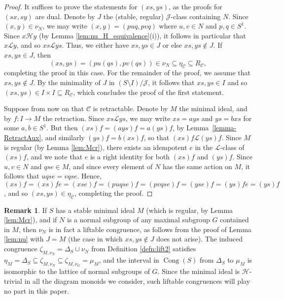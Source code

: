 \documentclass[11pt,a4paper]{article}
\newcommand{\C}{\mathscr C}
\renewcommand{\H}{\mathrel{\mathscr H}}
\renewcommand{\L}{\mathrel{\mathscr L}}
\newcommand{\R}{\mathrel{\mathscr R}}
\newcommand{\gJ}{\mathrel{\mathscr J}}
\newcommand{\De}{\Delta}
\newcommand{\Cong}{\operatorname{Cong}}
\newcommand{\1}{\id_n}
\newcommand{\mt}{\mapsto}
\newcommand{\sub}{\subseteq}
\numberwithin{equation}{section}
\theoremstyle{definition}
\newtheorem{rem}[equation]{Remark}
\begin{document}
\begin{proof}
It suffices to prove the statements for $(xs,ys)$, as the proofs for $(sx, sy)$ are dual.  Denote by $J$ the (stable, regular) $\gJ$-class containing $N$.  Since $(x,y)\in\nu_N$, we may write $(x,y)=(puq,pvq)$ where $u,v\in N$ and $p,q\in S^1$.  
%
Since $x\H y$ (by Lemma \ref{lem:nu_H_equivalence}(i)), it follows in particular that $x\L y$, and so $xs\L ys$.  Thus, we either have $xs, ys \in J$ or else $xs, ys\not\in J$.  If $xs,ys\in J$, then
\[
(xs,ys)=(pu(qs),pv(qs))\in\nu_N \subseteq \eta_\C \sub R_{\C},
\]
completing the proof in this case.
%
For the remainder of the proof, we assume that $xs,ys\not\in J$.  By the minimality of $J$ in $(S\setminus I)/{\gJ}$,
it follows that $xs,ys\in I$ and so $(xs, ys)\in I\times I \sub R_{\C}$, which
concludes the proof of the first statement.

Suppose from now on that $\C$ is retractable. Denote by $M$ the minimal ideal, and by $f:I\to M$ the retraction.  Since $xs\L ys$, we may write $xs=ays$ and $ys=bxs$ for some $a,b\in S^1$.  But then $(xs)f=(ays)f=a(ys)f$, by Lemma~\ref{lemma-RetractAux}, and similarly $(ys)f=b(xs)f$, so that $(xs)f\L (ys)f$.  Since $M$ is regular (by Lemma \ref{lem:Mcr}), there exists an idempotent $e$ in the $\L$-class of $(xs)f$, and we note that $e$ is a right identity for both $(xs)f$ and $(ys)f$.  Since $u,v\in N$ and $qse\in M$, and since every element of $N$ has the same action on $M$, it follows that $uqse=vqse$. Hence, $(xs)f=(xs)fe=(xse)f=(puqse)f=(pvqse)f=(yse)f=(ys)fe=(ys)f$, and so $(xs,ys)\in \eta_{\C}$, completing the proof.
\end{proof}

\begin{rem}
If $S$ has a stable minimal ideal $M$ (which is regular, by Lemma \ref{lem:Mcr}), and if $N$ is a normal subgroup of any maximal subgroup $G$ contained in $M$, then $\nu_N$ is in fact a liftable congruence, as follows from the proof of Lemma \ref{lem:nu} with $J=M$ (the case in which $xs,ys\not\in J$ does not arise).  The induced congruence $\zeta_{M,\nu_N}=\De_S\cup\nu_N$ from Definition \ref{defn:lift2} satisfies $\eta_M=\De_S\sub\zeta_{M,\nu_N}\sub\zeta_{M,\nu_G}=\mu_M$, and the interval in $\Cong(S)$ from $\De_S$ to $\mu_M$ is isomorphic to the lattice of normal subgroups of $G$.  Since the minimal ideal is $\H$-trivial in all the diagram monoids we consider, such liftable congruences will play no part in this paper.  
\end{rem}
\end{document}
